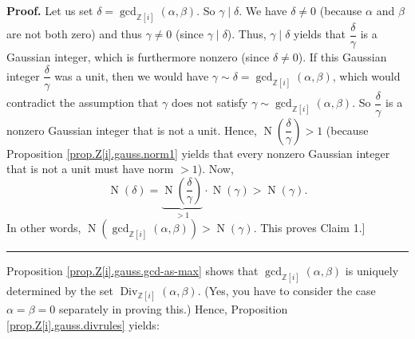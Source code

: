 \documentclass[numbers=enddot,12pt,final,onecolumn,notitlepage]{scrartcl}%
\numberwithin{exer}{subsection}
\theoremstyle{definition}
\newenvironment{proof}[1][Proof]{\noindent\textbf{#1.} }{\ \rule{0.5em}{0.5em}}
\begin{document}
\begin{proof}
Let us set $\delta=\gcd\nolimits_{\mathbb{Z}\left[  i\right]  }\left(
\alpha,\beta\right)  $. So $\gamma\mid\delta$. We have $\delta\neq0$ (because
$\alpha$ and $\beta$ are not both zero) and thus $\gamma\neq0$ (since
$\gamma\mid\delta$). Thus, $\gamma\mid\delta$ yields that $\dfrac{\delta
}{\gamma}$ is a Gaussian integer, which is furthermore nonzero (since
$\delta\neq0$). If this Gaussian integer $\dfrac{\delta}{\gamma}$ was a unit,
then we would have $\gamma\sim\delta=\gcd\nolimits_{\mathbb{Z}\left[
i\right]  }\left(  \alpha,\beta\right)  $, which would contradict the
assumption that $\gamma$ does not satisfy $\gamma\sim\gcd\nolimits_{\mathbb{Z}%
\left[  i\right]  }\left(  \alpha,\beta\right)  $. So $\dfrac{\delta}{\gamma}$
is a nonzero Gaussian integer that is not a unit. Hence, $\operatorname*{N}%
\left(  \dfrac{\delta}{\gamma}\right)  >1$ (because Proposition
\ref{prop.Z[i].gauss.norm1} yields that every nonzero Gaussian integer that is
not a unit must have norm $>1$). Now,%
\[
\operatorname*{N}\left(  \delta\right)  =\underbrace{\operatorname*{N}\left(
\dfrac{\delta}{\gamma}\right)  }_{>1}\cdot\operatorname*{N}\left(
\gamma\right)  >\operatorname*{N}\left(  \gamma\right)  .
\]
In other words, $\operatorname*{N}\left(  \gcd\nolimits_{\mathbb{Z}\left[
i\right]  }\left(  \alpha,\beta\right)  \right)  >\operatorname*{N}\left(
\gamma\right)  $. This proves Claim 1.]
\end{proof}

Proposition \ref{prop.Z[i].gauss.gcd-as-max} shows that $\gcd
\nolimits_{\mathbb{Z}\left[  i\right]  }\left(  \alpha,\beta\right)  $ is
uniquely determined by the set $\operatorname*{Div}\nolimits_{\mathbb{Z}%
\left[  i\right]  }\left(  \alpha,\beta\right)  $. (Yes, you have to consider
the case $\alpha=\beta=0$ separately in proving this.) Hence, Proposition
\ref{prop.Z[i].gauss.divrules} yields:
\end{document}
